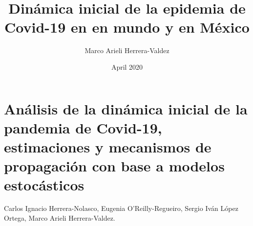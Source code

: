 \documentclass[8pt]{article}
\title{Dinámica inicial de la epidemia de Covid-19 en en mundo y en México }
\author{Marco Arieli Herrera-Valdez}
\date{April 2020}
\begin{document}
%
%
\section*{Análisis de la dinámica inicial de la pandemia de Covid-19, estimaciones y mecanismos de propagación con base a modelos estocásticos}
Carlos Ignacio Herrera-Nolasco, Eugenia O'Reilly-Regueiro, Sergio Iván López Ortega, Marco Arieli Herrera-Valdez. 







\newpage


\end{document}
